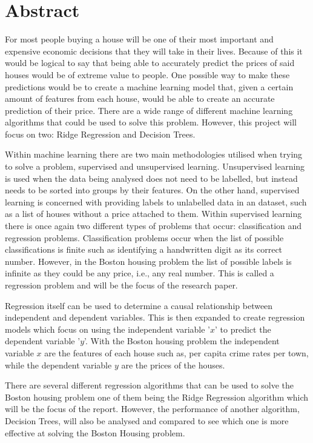 \section{Abstract}
For most people buying a house will be one of their most important and expensive economic decisions that they will take in their lives.\cite{Lida_R_Weinstock} Because of this it would be logical to say that being able to accurately predict the prices of said houses would be of extreme value to people. One possible way to make these predictions would be to create a machine learning model that, given a certain amount of features from each house, would be able to create an accurate prediction of their price. There are a wide range of different machine learning algorithms that could be used to solve this problem. However, this project will focus on two: Ridge Regression and Decision Trees.

Within machine learning there are two main methodologies utilised when trying to solve a problem, supervised and unsupervised learning. Unsupervised learning is used when the data being analysed does not need to be labelled, but instead needs to be sorted into groups by their features. On the other hand, supervised learning is concerned with providing labels to unlabelled data in an dataset, such as a list of houses without a price attached to them. Within supervised learning there is once again two different types of problems that occur: classification and regression problems. Classification problems occur when the list of possible classifications is finite such as identifying a handwritten digit as its correct number. However, in the Boston housing problem the list of possible labels is infinite as they could be any price, i.e., any real number.\cite{Volodymyr_Vovk_ch2} This is called a regression problem and will be the focus of the research paper.

Regression itself can be used to determine a causal relationship between independent and dependent variables. This is then expanded to create regression models which focus on using the independent variable '\(x\)' to predict the dependent variable '\(y\)'.\cite{Maulud_Abdulazeez_2020} With the Boston housing problem the independent variable \(x\) are the features of each house such as, per capita crime rates per town, while the dependent variable \(y\) are the prices of the houses.\cite{Shashank_Gupta} 

There are several different regression algorithms that can be used to solve the Boston housing problem one of them being the Ridge Regression algorithm which will be the focus of the report. However, the performance of another algorithm, Decision Trees, will also be analysed and compared to see which one is more effective at solving the Boston Housing problem. 

